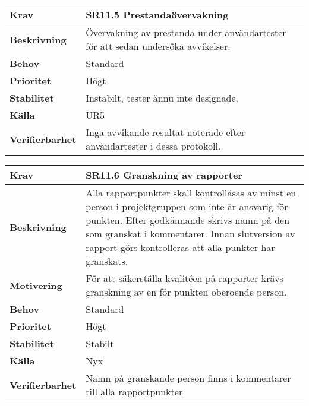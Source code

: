 \documentclass[a4paper, twoside, 11pt, titlepage]{article}
\begin{document}
\begin{tabular} { p{2.6cm} p{12.5cm} }
	\hline
	\sffamily\textbf{Krav} & \sffamily\textbf{SR11.5 Prestandaövervakning } \\
	\hline
	\sffamily\textbf{Beskrivning} &  Övervakning av prestanda under användartester för att sedan undersöka avvikelser.   \\
	\hline
	\sffamily\textbf{Behov} & Standard  \\
	\hline
	\sffamily\textbf{Prioritet} &  Högt  \\
	\hline
	\sffamily\textbf{Stabilitet} &  Instabilt, tester ännu inte designade.   \\
	\hline
	\sffamily\textbf{Källa} &  UR5   \\
	\hline
	\sffamily\textbf{Verifierbarhet} &  Inga avvikande resultat noterade efter användartester i dessa protokoll.   \\
	\hline
\end{tabular}
\vspace{6mm}

\begin{tabular} { p{2.6cm} p{12.5cm} }
	\hline
	\sffamily\textbf{Krav} & \sffamily\textbf{SR11.6 Granskning av rapporter  } \\
	\hline
	\sffamily\textbf{Beskrivning} &  Alla rapportpunkter skall kontrolläsas av minst en person i projektgruppen som inte är ansvarig för punkten. Efter godkännande skrivs namn på den som granskat i kommentarer. Innan slutversion av rapport görs kontrolleras att alla punkter har granskats.   \\
	\hline
	\sffamily\textbf{Motivering} &  För att säkerställa kvalitéen på rapporter krävs granskning av en för punkten oberoende person.   \\
	\hline
	\sffamily\textbf{Behov} &  Standard   \\
	\hline
	\sffamily\textbf{Prioritet} &  Högt  \\
	\hline
	\sffamily\textbf{Stabilitet} &  Stabilt  \\
	\hline
	\sffamily\textbf{Källa} &  Nyx   \\
	\hline
	\sffamily\textbf{Verifierbarhet} &  Namn på granskande person finns i kommentarer till alla rapportpunkter.   \\
	\hline
\end{tabular}
\vspace{6mm}
\end{document}
